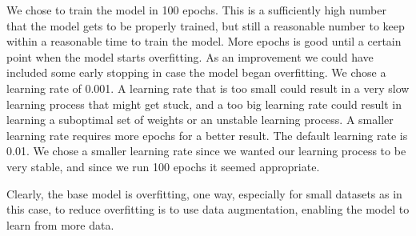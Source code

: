 We chose to train the model in 100 epochs. This is a sufficiently high number that the model gets to be properly trained, but still a reasonable number to keep within a reasonable time to train the model. More epochs is good until a certain point when the model starts overfitting. As an improvement we could have included some early stopping in case the model began overfitting.
We chose a learning rate of 0.001. A learning rate that is too small could result in a very slow learning process that might get stuck, and a too big learning rate could result in learning a suboptimal set of weights or an unstable learning process. A smaller learning rate requires more epochs for a better result. The default learning rate is 0.01. We chose a smaller learning rate since we wanted our learning process to be very stable, and since we run 100 epochs it seemed appropriate.

Clearly, the base model is overfitting, one way, especially for small datasets as in this case, to reduce overfitting is to use data augmentation, enabling the model to learn from more data.
